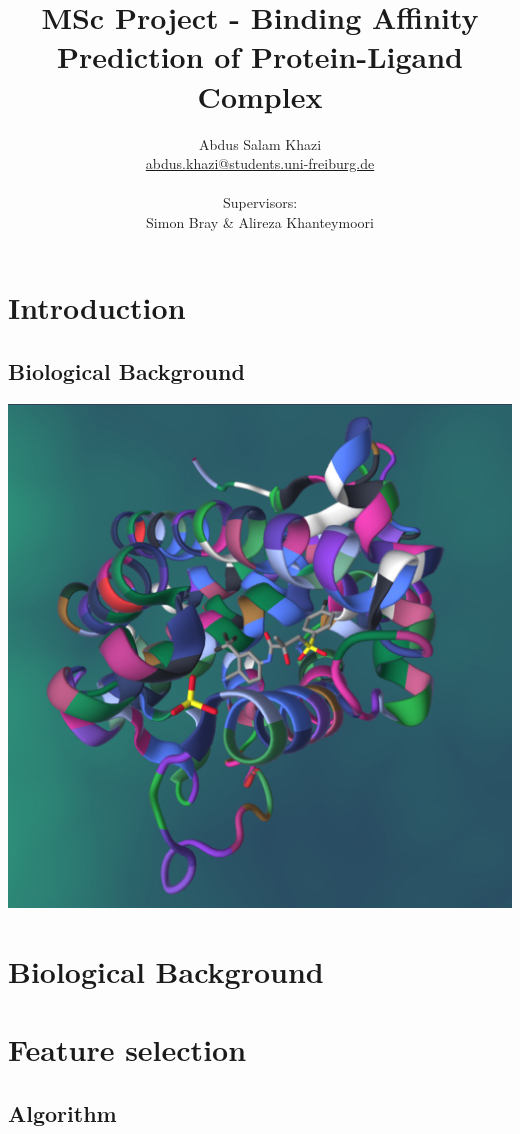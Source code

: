 \documentclass[11pt]{article}
\title{MSc Project - Binding Affinity Prediction of Protein-Ligand Complex}
\author{
        Abdus Salam Khazi\\
        \href{mailto:abdus.khazi@students.uni-freiburg.de}
                {abdus.khazi@students.uni-freiburg.de}\\ \\
        Supervisors:
        \begin{tabular}{ll}
			Simon Bray \&
			Alireza Khanteymoori
		\end{tabular}
       }
\begin{document}
\maketitle
\date{}
\tableofcontents
\newpage

\section{Introduction}
\subsection{Biological Background}

\includegraphics[scale=0.15]{pl_complex}
\cite{PL_complex_introduction}

\section{Biological Background}

\section{Feature selection}
\label{fs}

\subsection{Algorithm}
\end{document}
